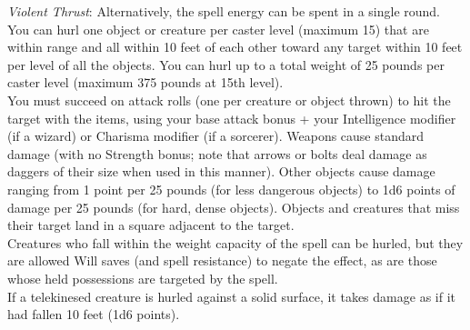 \textit{Violent Thrust}: Alternatively, the spell energy can be spent in a single round. You can hurl one object or creature per caster level (maximum 15) that are within range and all within 10 feet of each other toward any target within 10 feet per level of all the objects. You can hurl up to a total weight of 25 pounds per caster level (maximum 375 pounds at 15th level).\\
You must succeed on attack rolls (one per creature or object thrown) to hit the target with the items, using your base attack bonus + your Intelligence modifier (if a wizard) or Charisma modifier (if a sorcerer). Weapons cause standard damage (with no Strength bonus; note that arrows or bolts deal damage as daggers of their size when used in this manner). Other objects cause damage ranging from 1 point per 25 pounds (for less dangerous objects) to 1d6 points of damage per 25 pounds (for hard, dense objects). Objects and creatures that miss their target land in a square adjacent to the target.\\
Creatures who fall within the weight capacity of the spell can be hurled, but they are allowed Will saves (and spell resistance) to negate the effect, as are those whose held possessions are targeted by the spell.\\
If a telekinesed creature is hurled against a solid surface, it takes damage as if it had fallen 10 feet (1d6 points).\\
